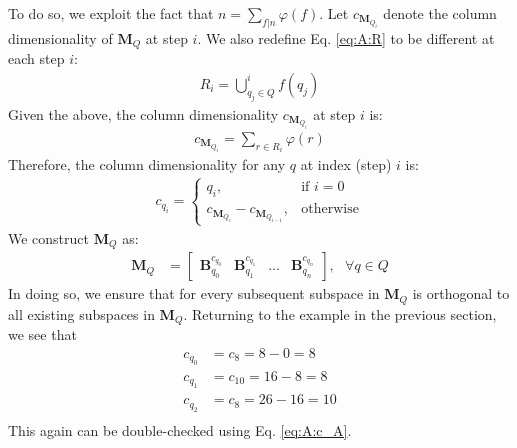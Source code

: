     To do so, we exploit the fact that $n = \sum_{f|n} \varphi(f)$. Let $c_{\bm{M}_{Q_i}}$ denote the column dimensionality of $\bm{M}_Q$ at step $i$. We also redefine Eq. \eqref{eq:A:R} to be different at each step $i$:
    \begin{align}\label{eq:A:onlyPeriods:R}
        R_i = \bigcup^i_{q_j \in Q} f(q_j)
    \end{align}
    Given the above, the column dimensionality $c_{\bm{M}_{Q_i}}$ at step $i$ is:
    \begin{align*}
        c_{\bm{M}_{Q_i}} = \sum_{r \in R_i} \varphi(r)
    \end{align*}
    Therefore, the column dimensionality for any $q$ at index (step) $i$ is:
    \begin{align}
        c_{q_i} =
            \begin{cases}
                q_i, & \text{if } i = 0 \\
                c_{\bm{M}_{Q_i}} - c_{\bm{M}_Q_{i-1}}, & \text{otherwise}
            \end{cases}
    \end{align}
    We construct $\bm{M}_Q$ as:
    \begin{align*}
        \bm{M}_Q &= \begin{bmatrix}
                \bm{B}_{q_0}^{c_{q_0}} &
                \bm{B}_{q_1}^{c_{q_1}} &
                \hdots &
                \bm{B}_{q_n}^{c_{q_n}}
            \end{bmatrix}
            , \text{ } \forall q \in Q
    \end{align*}
    In doing so, we ensure that for every subsequent subspace in $\bm{M}_Q$ is orthogonal to all existing subspaces in $\bm{M}_Q$. Returning to the example in the previous section, we see that
    \begin{align*}
        c_{q_0} &= c_{8} = 8 - 0 = 8 \\
        c_{q_1} &= c_{10} = 16 - 8 = 8 \\
        c_{q_2} &= c_{8} = 26 - 16 = 10 \\
    \end{align*}
    This again can be double-checked using Eq. \eqref{eq:A:c_A}.

